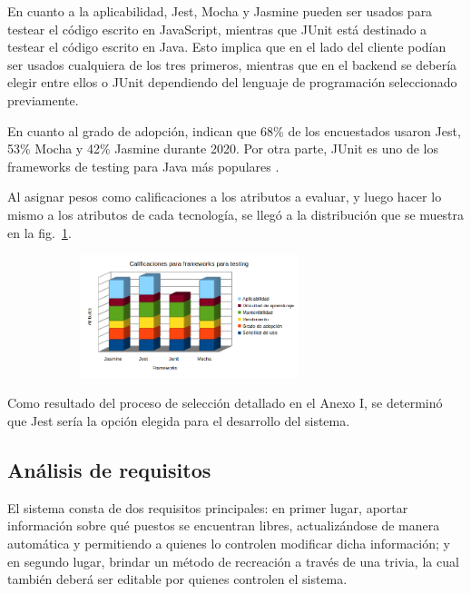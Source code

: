 \documentclass[twoside]{article}
\begin{document}
En cuanto a la aplicabilidad, Jest, Mocha y Jasmine pueden ser usados para testear el código escrito en JavaScript, mientras que JUnit está destinado a testear el código escrito en Java. Esto implica que en el lado del cliente podían ser usados cualquiera de los tres primeros, mientras que en el backend se debería elegir entre ellos o JUnit dependiendo del lenguaje de programación seleccionado previamente.

En cuanto al grado de adopción, \textcite{stateofjsTesting} indican que 68\% de los encuestados usaron Jest, 53\% Mocha y 42\% Jasmine durante 2020. Por otra parte, JUnit es uno de los frameworks de testing para Java más populares \parencite{headspinJUnit}.

Al asignar pesos como calificaciones a los atributos a evaluar, y luego hacer lo mismo a los atributos de cada tecnología, se llegó a la distribución que se muestra en la fig.~\ref{fig:testing}.
\begin{figure}[H]
	\caption{Gráfico de calificaciones de frameworks para hacer testing del código}
    \begin{subfigure}{1\textwidth}
	\includegraphics[width=0.7\textwidth]{calificaciones para frameworks para testing.png}
    \end{subfigure}
	\label{fig:testing}
\end{figure}
\vspace{-1.0\baselineskip}
Como resultado del proceso de selección detallado en el Anexo I, se determinó que Jest sería la opción elegida para el desarrollo del sistema.
\subsection{Análisis de requisitos}
El sistema consta de dos requisitos principales: en primer lugar, aportar información sobre qué puestos se encuentran libres, actualizándose de manera automática y permitiendo a quienes lo controlen modificar dicha información; y en segundo lugar, brindar un método de recreación a través de una trivia, la cual también deberá ser editable por quienes controlen el sistema.
\end{document}
